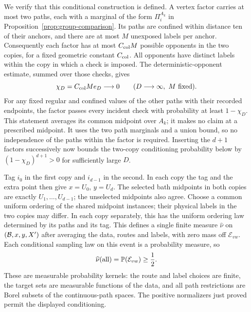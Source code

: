 We verify that this conditional construction is defined. A vertex factor
carries at most two paths, each with a marginal of the form $\Pi_i^{A_k}$
in Proposition~\ref{prop:group-comparison}. Its paths are confined within distance
ten of their anchors, and there are at most $M$ unexposed labels per anchor.
Consequently each factor has at most $C_{\rm col}M$ possible opponents in the two
copies, for a fixed geometric constant $C_{\rm col}$. All opponents have distinct labels within the copy in which a check
is imposed. The deterministic-opponent estimate, summed over those checks,
gives
\begin{equation}\label{cmp:compatibility}
 \chi_D=C_{\rm col}M e_D\longrightarrow0
 \qquad(D\longrightarrow\infty,\ M\text{ fixed}).
\end{equation}
For any fixed regular and confined values of the other paths with their
recorded endpoints, the factor passes every incident check with probability
at least $1-\chi_D$.
This statement averages its common midpoint over $A_k$; it makes no claim at
a prescribed midpoint. It uses the two path marginals and a union bound,
so no independence of the paths within the factor is required. Inserting
the $d+1$ factors successively now bounds the two-copy conditioning
probability below by $(1-\chi_D)^{d+1}>0$ for sufficiently large $D$.

Tag $i_0$ in the first copy and $i_{d-1}$ in the second. In each copy the
tag and the extra point then give $x=U_0$, $y=U_d$. The selected bath
midpoints in both copies are exactly $U_1,\ldots,U_{d-1}$; the unselected
midpoints also agree. Choose a common uniform ordering of the shared midpoint instances; their
physical labels in the two copies may differ. In each copy separately,
this has the uniform ordering law determined by its paths and its tag.
This defines a single finite measure $\widehat\nu$ on $(\mathcal B,x,y,X')$ after
averaging the data, routes and labels, with zero mass off $\mathcal E_{vw}$.
Each conditional sampling law on this event is a probability measure, so
\begin{equation}\label{cmp:common-mass}
 \widehat\nu(\text{all})=\mathbb P(\mathcal E_{vw})\ge\frac12.
\end{equation}
These are measurable probability kernels: the route and label choices are
finite, the target sets are measurable functions of the data, and all
path restrictions are Borel subsets of the continuous-path spaces. The
positive normalizers just proved permit the displayed conditioning.

